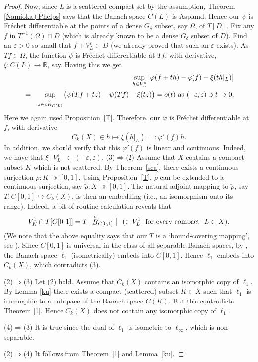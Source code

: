 \documentclass[12pt]{amsart}
\theoremstyle{plain}
\theoremstyle{definition}
\theoremstyle{remark}
\def\ee{\varepsilon}
\def\R{{\mathbb R}}
\def\vv{\varphi}
\def\ee{\varepsilon}
\def\ee{\varepsilon}
\begin{document}
\begin{proof}
Now, since $L$ is a scattered compact set by the assumption,  Theorem \ref{Namioka+Phelps}  says that
the Banach space $C(L)$ is Asplund. Hence our $\psi$ is Fr\'echet differentiable at the points of
a dense $G_\delta$ subset, say $\Omega$, of $T[D]$.
Fix any $f$ in $T^{-1}(\Omega)\cap D$ (which is already known to be a dense $G_\delta$ subset of $D$).
Find an $\ee>0$ so small that $f+V^\ee_L\subset D$ (we already proved that such an $\ee$ exists).
As $Tf\in\Omega$, the function $\psi$ is Fr\'echet differentiable at $Tf$, with derivative, $\xi: C(L)\to\R$, say.
Having this we get
\begin{eqnarray*}
&&\sup_{h\in V_L^\ee}\big|\vv(f+ th)-\vv(f) - \xi(th|_L)\big| \cr
&= & \sup_{z\in \ee \stackrel \circ B_{C(L)}}\big( \psi(T f + tz)-\psi(T f)-\xi(tz)\big) = o(t)\,\,{\rm as}\,\,(-\ee,\ee)\ni t\to 0;
\end{eqnarray*}
Here we again used Proposition~\ref{T}. Therefore, our $\vv$ is Fr\'echet differentiable at $f$, with derivative $$C_k(X)\in h \longmapsto \xi(h|_L)=: \vv'(f)h.$$
In addition, we should verify that this $\vv'(f)$ is linear and continuous. Indeed, we have that
$\xi[V^\ee_L] \subset (-\ee,\ee)$.
\smallskip
(3)$\Longrightarrow$(2)
Assume that $X$ contains a compact subset $K$ which is not scattered. By Theorem~\ref{sca}, there exists a continuous surjection $\rho: K\twoheadrightarrow [0,1]$.
Using Proposition~\ref{T}, $\rho$ can be extended to a continuous surjection, say  $\check \rho: X\twoheadrightarrow [0,1]$.
The natural adjoint mapping to $\check\rho$, say $T: C[0,1]\hookrightarrow C_k(X)$, is then an  embedding (i.e., an isomorphism onto its range). Indeed, a bit of routine calculation  reveals that
$$
V^1_K \cap T[C[0,1]]= T\big[\stackrel \circ B_{C[0,1]}\big]\  \ (\subset V^1_L\ \ {\rm for \ every\  compact}\  \ L\subset X).
$$
(We note that the above equality says that our $T$ is a `bound-covering mapping', see \cite{es}).
Since $C[0,1]$ is universal in the class of all separable Banach spaces, by \cite[Proposition 1.5]{Pelczynski-Bessaga},
the Banach space $\ell_{1}$ (isometrically) embeds into $C[0,1]$. Hence $\ell_1$  embeds into $C_k(X)$, which contradicts (3).
\smallskip

(2)$\Longrightarrow$(3)  Let (2) hold. Assume that $C_{k}(X)$ contains an isomorphic copy of $\ell_{1}$. By Lemma \ref{ku} there exists
a compact (scattered) subset $K\subset X$ such that $\ell_1$ is isomorphic to a subspace of the Banach space $C(K)$. But this contradicts Theorem \ref{1}.
Hence $C_k(X)$ does not contain any isomorphic  copy of $\ell_1$.

\smallskip
(4)$\Longrightarrow$(3) It is true since the dual of $\ell_1$ is isometric to $\ell_\infty$, which is non-separable.

\smallskip


(2)$\Longrightarrow$(4) It follows from Theorem~\ref{1} and Lemma~\ref{ku}.
\end{proof}
\end{document}
